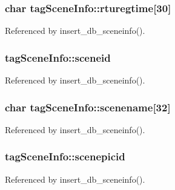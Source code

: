 \hypertarget{structtagSceneInfo_a9cd871ca34fcbccd5529e7df362b6791}{
\subsubsection[{rturegtime}]{\setlength{\rightskip}{0pt plus 5cm}char tag\-Scene\-Info\-::rturegtime\mbox{[}30\mbox{]}}}\label{structtagSceneInfo_a9cd871ca34fcbccd5529e7df362b6791}


Referenced by insert\-\_\-db\-\_\-sceneinfo().

\hypertarget{structtagSceneInfo_adb1a89565386eb72b294159e322a1b89}{
\subsubsection[{sceneid}]{ tag\-Scene\-Info\-::sceneid}}\label{structtagSceneInfo_adb1a89565386eb72b294159e322a1b89}


Referenced by insert\-\_\-db\-\_\-sceneinfo().

\hypertarget{structtagSceneInfo_a62bc464e8f97b44c40564646cd682bee}{
\subsubsection[{scenename}]{\setlength{\rightskip}{0pt plus 5cm}char tag\-Scene\-Info\-::scenename\mbox{[}32\mbox{]}}}\label{structtagSceneInfo_a62bc464e8f97b44c40564646cd682bee}


Referenced by insert\-\_\-db\-\_\-sceneinfo().

\hypertarget{structtagSceneInfo_a9ef586d7295c6cdfaf7eb95a6fdb4f2d}{
\subsubsection[{scenepicid}]{ tag\-Scene\-Info\-::scenepicid}}\label{structtagSceneInfo_a9ef586d7295c6cdfaf7eb95a6fdb4f2d}


Referenced by insert\-\_\-db\-\_\-sceneinfo().


